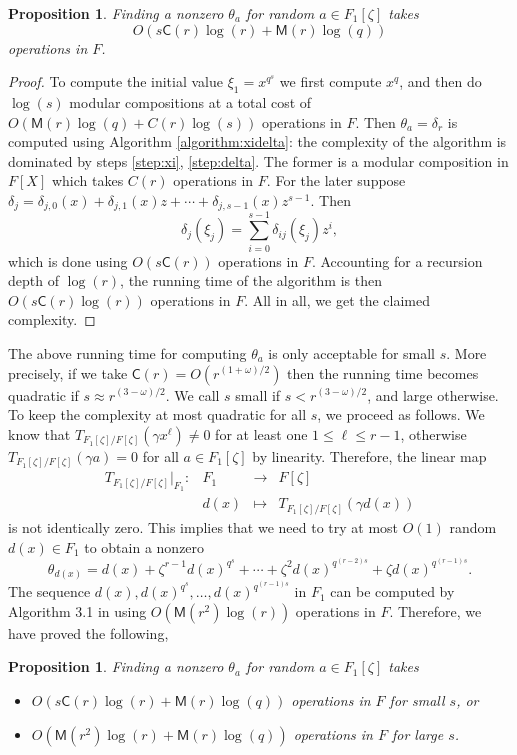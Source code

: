\documentclass[12pt]{article}
\theoremstyle{plain}
\newtheorem{proposition}[theorem]{Proposition}
\theoremstyle{definition}
\def\MM{\ensuremath{\mathsf{M}}}
\def\CC{\ensuremath{\mathsf{C}}}
\newcounter{algorithm}
\begin{document}
\begin{proposition}
	\label{proposition:XiDelta}
	Finding a nonzero $\theta_a$ for random $a \in F_1[\zeta]$ takes \[O(s\CC(r)\log(r) + 
	\MM(r)\log(q))\] operations in $F$.
\end{proposition}
\begin{proof}
	To compute the initial value $\xi_1 = x^{q^s}$ we first compute $x^q$, and then do $\log(s)$ 
	modular compositions at a total cost of $O(\MM(r)\log(q) + C(r)\log(s))$ operations in $F$. 
	Then $\theta_a = \delta_r$ is computed using Algorithm \ref{algorithm:xidelta}: the complexity 
	of the algorithm is dominated by steps \ref{step:xi}, \ref{step:delta}. The former is a
	modular composition in $F[X]$ which takes $C(r)$ operations in $F$. For the later suppose 
	$\delta_j = \delta_{j,0}(x) + \delta_{j,1}(x)z + \cdots + \delta_{j,s - 1}(x)z^{s - 1}$. Then   
	\[ \delta_j(\xi_j) = \sum_{i = 0}^{s - 1}\delta_{ij}(\xi_j)z^i, \] which is done using 
	$O(s\CC(r))$ operations in $F$. Accounting for a recursion depth of $\log(r)$, the running 
	time of the algorithm is then $O(s\CC(r)\log(r))$ operations in $F$. All in all, we get the 
	claimed 
	complexity.
\end{proof}
The above running time for computing $\theta_a$ is only acceptable for small $s$. More precisely, 
if we take $\CC(r) = O(r^{(1 + \omega) / 2})$ then the running time becomes quadratic if $s \approx 
r^{(3 - \omega) / 2}$. We call $s$ small if $s < r^{(3 - \omega) / 2}$, and large otherwise. To 
keep the complexity at most quadratic for all $s$, we proceed as follows. We know that 
$T_{F_1[\zeta] / F[\zeta]}(\gamma x^\ell) \ne 0$ for at least one $1 \le \ell \le r - 1$, otherwise 
$T_{F_1[\zeta] / F[\zeta]}(\gamma a) = 0$ for all $a \in F_1[\zeta]$ by linearity. Therefore, the 
linear map 
\[
\begin{array}{rrll}
	T_{F_1[\zeta] / F[\zeta]}\vert_{F_1}: & F_1 & \longrightarrow & F[\zeta] \\
	& d(x) & \longmapsto & T_{F_1[\zeta] / F[\zeta]}(\gamma d(x))
\end{array}
\]
is not identically zero. This implies that we need to try at most $O(1)$ random $d(x) \in F_1$ to 
obtain a nonzero
\[ \theta_{d(x)} = d(x) + \zeta^{r - 1}d(x)^{q^s} + \cdots + \zeta^2d(x)^{q^{(r - 2)s}} + \zeta 
d(x)^{q^{(r - 1)s}}. \]
The sequence $d(x), d(x)^{q^s}, \dots, d(x)^{q^{(r - 1)s}}$ in $F_1$ can be computed by Algorithm 
3.1 in \cite{von1992computing} using $O(\MM(r^2)\log(r))$ operations in $F$. Therefore, we have 
proved the following,
\begin{proposition}
	\label{proposition:XiDelta-updated}
	Finding a nonzero $\theta_a$ for random $a \in F_1[\zeta]$ takes
	\begin{itemize}
		\item $O(s\CC(r)\log(r) + \MM(r)\log(q))$ operations in $F$ for small $s$, or
		\item $O(\MM(r^2)\log(r) + \MM(r)\log(q))$ operations in $F$ for large $s$.
	\end{itemize}
\end{proposition}
\end{document}
